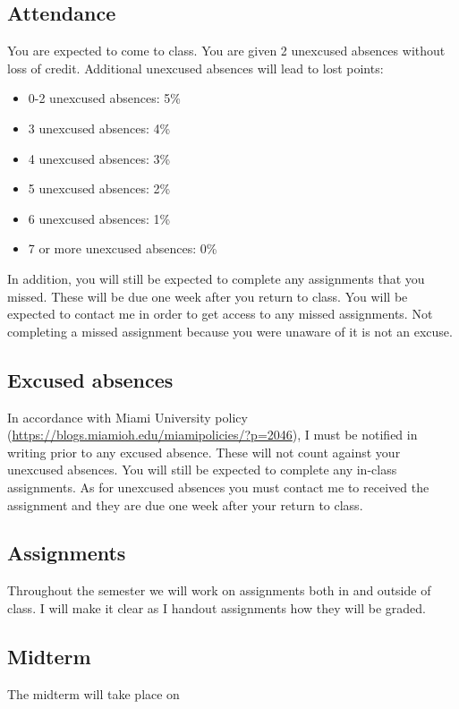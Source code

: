 \documentclass[11pt]{article}
\begin{document}
\subsection*{Attendance} You are expected to come to class. You are given 2 unexcused absences without loss of credit. Additional unexcused absences will lead to lost points:
\begin{itemize}
	\item 0-2 unexcused absences: 5\% 
	\item 3 unexcused absences: 4\% 
	\item 4 unexcused absences: 3\% 
	\item 5 unexcused absences: 2\% 
	\item 6 unexcused absences: 1\% 
	\item 7 or more unexcused absences: 0\% 
\end{itemize}
In addition, you will still be expected to complete any assignments that you missed. These will be due one week after you return to class. You will be expected to contact me in order to get access to any missed assignments. Not completing a missed assignment because you were unaware of it is not an excuse. \\

\subsection*{Excused absences} In accordance with Miami University policy (\url{https://blogs.miamioh.edu/miamipolicies/?p=2046}), I must be notified in writing prior to any excused absence. These will not count against your unexcused absences. You will still be expected to complete any in-class assignments. As for unexcused absences you must contact me to received the assignment and they are due one week after your return to class. \\

\subsection*{Assignments} Throughout the semester we will work on assignments both in and outside of class. I will make it clear as I handout assignments how they will be graded. \\

\subsection*{Midterm} The midterm will take place on \\ 
\end{document}
